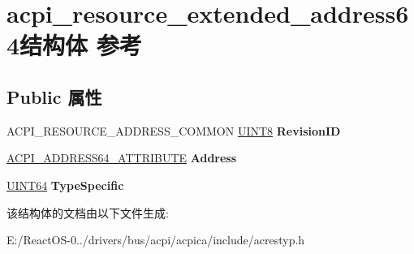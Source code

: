 \hypertarget{structacpi__resource__extended__address64}{}\section{acpi\+\_\+resource\+\_\+extended\+\_\+address64结构体 参考}
\label{structacpi__resource__extended__address64}
\subsection*{Public 属性}
\begin{DoxyCompactItemize}
\item 
\mbox{\label{structacpi__resource__extended__address64_ae4796b4172b1edea2833ddc66bb331c6}} 
A\+C\+P\+I\+\_\+\+R\+E\+S\+O\+U\+R\+C\+E\+\_\+\+A\+D\+D\+R\+E\+S\+S\+\_\+\+C\+O\+M\+M\+ON \hyperlink{_processor_bind_8h_ab27e9918b538ce9d8ca692479b375b6a}{U\+I\+N\+T8} {\bfseries Revision\+ID}
\item 
\mbox{\label{structacpi__resource__extended__address64_a61bbfdb8b408c52bba72d0f7da1a50e2}} 
\hyperlink{structacpi__address64__attribute}{A\+C\+P\+I\+\_\+\+A\+D\+D\+R\+E\+S\+S64\+\_\+\+A\+T\+T\+R\+I\+B\+U\+TE} {\bfseries Address}
\item 
\mbox{\label{structacpi__resource__extended__address64_ad25d150bc0b854f87a01dda1cc00e538}} 
\hyperlink{_processor_bind_8h_a57be03562867144161c1bfee95ca8f7c}{U\+I\+N\+T64} {\bfseries Type\+Specific}
\end{DoxyCompactItemize}


该结构体的文档由以下文件生成\+:\begin{DoxyCompactItemize}
\item 
E\+:/\+React\+O\+S-\/0../drivers/bus/acpi/acpica/include/acrestyp.\+h\end{DoxyCompactItemize}
